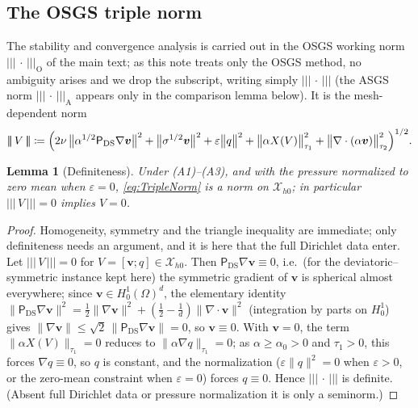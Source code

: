 \documentclass[11pt]{article}
\newtheorem{lemma}[theorem]{Lemma}
\theoremstyle{remark}
\newcommand{\bv}{\boldsymbol{v}}
\newcommand{\ViscProj}{\mathsf{P}_{\mathrm{DS}}}
\newcommand{\norm}[1]{\lVert #1 \rVert}
\newcommand{\tnorm}[1]{\lvert\!\lvert\!\lvert\, #1 \,\rvert\!\rvert\!\rvert}
\newcommand{\Xhz}{\mathcal{X}_{h0}}
\begin{document}
\subsection{The OSGS triple norm}
\label{sec:norm}

The stability and convergence analysis is carried out in the OSGS working norm
$\tnorm{\cdot}_{\mathrm{O}}$ of the main text; as this note treats only the OSGS method, no
ambiguity arises and we drop the subscript, writing simply $\tnorm{\cdot}$ (the ASGS norm
$\tnorm{\cdot}_{\mathrm{A}}$ appears only in the comparison lemma below). It is the
mesh-dependent norm
\begin{equation}
  \label{eq:TripleNorm}
  \tnorm{V}
  \coloneqq
  \Bigl(
  2\nu\,\bigl\lVert \alpha^{1/2}\ViscProj\nabla\bv \bigr\rVert^2
  + \bigl\lVert\sigma^{1/2}\bv\bigr\rVert^2
  + \varepsilon\bigl\lVert q\bigr\rVert^2
  + \bigl\lVert\alpha X(V)\bigr\rVert_{\tau_1}^2
  + \bigl\lVert\nabla\cdot(\alpha\bv)\bigr\rVert_{\tau_2}^2
  \Bigr)^{1/2}.
\end{equation}

\begin{lemma}[Definiteness]
\label{lem:definiteness}
Under \textup{(A1)--(A3)}, and with the pressure normalized to zero mean when
$\varepsilon = 0$, \cref{eq:TripleNorm} is a norm on $\Xhz$; in particular $\tnorm{V} = 0$
implies $V = 0$.
\end{lemma}

\begin{proof}
Homogeneity, symmetry and the triangle inequality are immediate; only definiteness needs an
argument, and it is here that the full Dirichlet data enter. Let $\tnorm{V} = 0$ for
$V = [\bv; q] \in \Xhz$. Then $\ViscProj\nabla\bv \equiv 0$, i.e.\ (for the deviatoric--symmetric instance kept here)
the symmetric gradient of
$\bv$ is spherical almost everywhere; since $\bv \in H^1_0(\Omega)^d$, the elementary identity
$\lVert\ViscProj\nabla\bv\rVert^2=\tfrac12\lVert\nabla\bv\rVert^2+(\tfrac12-\tfrac1d)\lVert\nabla\cdot\bv\rVert^2$
(integration by parts on $H^1_0$) gives $\norm{\nabla\bv} \le
\sqrt2\,\bigl\lVert\ViscProj\nabla\bv\bigr\rVert = 0$, so $\bv \equiv 0$. With $\bv = 0$, the term
$\norm{\alpha X(V)}_{\tau_1} = 0$ reduces to $\norm{\alpha\nabla q}_{\tau_1} = 0$; as
$\alpha \ge \alpha_0 > 0$ and $\tau_1 > 0$, this forces $\nabla q \equiv 0$, so $q$ is
constant, and the normalization ($\varepsilon\norm{q}^2 = 0$ when $\varepsilon > 0$, or the
zero-mean constraint when $\varepsilon = 0$) forces $q \equiv 0$. Hence $\tnorm{\cdot}$ is
definite. (Absent full Dirichlet data or pressure normalization it is only a seminorm.)
\end{proof}
\end{document}
